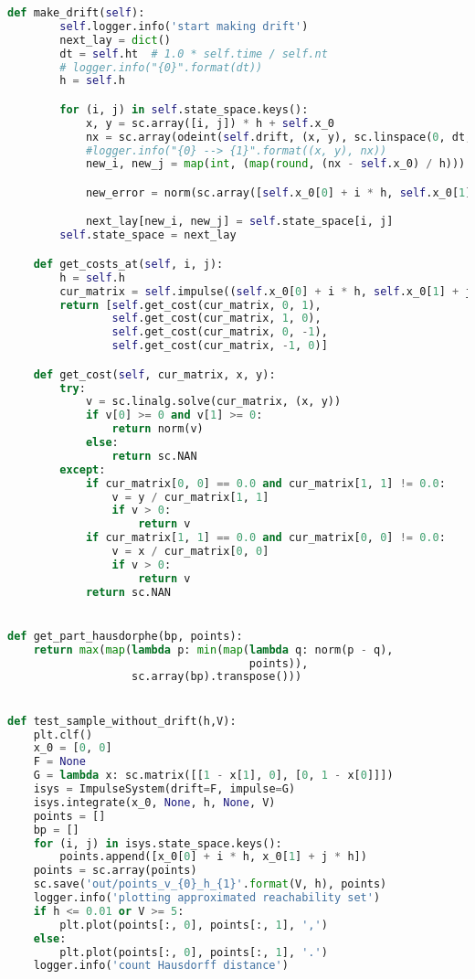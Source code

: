 \begin{lstlisting}[language=Python,
caption={Интерфейс Impulse System}]
    def make_drift(self):
        self.logger.info('start making drift')
        next_lay = dict()
        dt = self.ht  # 1.0 * self.time / self.nt
        # logger.info("{0}".format(dt))
        h = self.h

        for (i, j) in self.state_space.keys():
            x, y = sc.array([i, j]) * h + self.x_0
            nx = sc.array(odeint(self.drift, (x, y), sc.linspace(0, dt, 10))[-1])
            #logger.info("{0} --> {1}".format((x, y), nx))
            new_i, new_j = map(int, (map(round, (nx - self.x_0) / h)))

            new_error = norm(sc.array([self.x_0[0] + i * h, self.x_0[1] + j * h]) - nx)

            next_lay[new_i, new_j] = self.state_space[i, j]
        self.state_space = next_lay

    def get_costs_at(self, i, j):
        h = self.h
        cur_matrix = self.impulse((self.x_0[0] + i * h, self.x_0[1] + j * h))
        return [self.get_cost(cur_matrix, 0, 1),
                self.get_cost(cur_matrix, 1, 0),
                self.get_cost(cur_matrix, 0, -1),
                self.get_cost(cur_matrix, -1, 0)]

    def get_cost(self, cur_matrix, x, y):
        try:
            v = sc.linalg.solve(cur_matrix, (x, y))
            if v[0] >= 0 and v[1] >= 0:
                return norm(v)
            else:
                return sc.NAN
        except:
            if cur_matrix[0, 0] == 0.0 and cur_matrix[1, 1] != 0.0:
                v = y / cur_matrix[1, 1]
                if v > 0:
                    return v
            if cur_matrix[1, 1] == 0.0 and cur_matrix[0, 0] != 0.0:
                v = x / cur_matrix[0, 0]
                if v > 0:
                    return v
            return sc.NAN


def get_part_hausdorphe(bp, points):
    return max(map(lambda p: min(map(lambda q: norm(p - q),
                                     points)),
                   sc.array(bp).transpose()))


def test_sample_without_drift(h,V):
    plt.clf()
    x_0 = [0, 0]
    F = None
    G = lambda x: sc.matrix([[1 - x[1], 0], [0, 1 - x[0]]])
    isys = ImpulseSystem(drift=F, impulse=G)
    isys.integrate(x_0, None, h, None, V)
    points = []
    bp = []
    for (i, j) in isys.state_space.keys():
        points.append([x_0[0] + i * h, x_0[1] + j * h])
    points = sc.array(points)
    sc.save('out/points_v_{0}_h_{1}'.format(V, h), points)
    logger.info('plotting approximated reachability set')
    if h <= 0.01 or V >= 5:
        plt.plot(points[:, 0], points[:, 1], ',')
    else:
        plt.plot(points[:, 0], points[:, 1], '.')
    logger.info('count Hausdorff distance')


\end{lstlisting}
